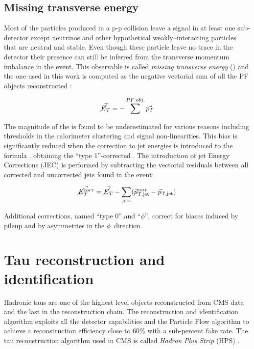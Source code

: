 \subsection{Missing transverse energy}

Most of the particles produced in a p-p collision leave a signal in at least one sub-detector except neutrinos and other hypothetical weakly--interacting particles that are neutral and stable. Even though these particle leave no trace in the detector their presence can still be inferred from the transverse momentum imbalance in the event. This observable is called \emph{missing transverse energy} (\MET) and the one used in this work is computed as the negative vectorial sum of all the PF objects reconstructed \cite{CMS-PAS-JME-13-003}: 

\begin{equation}
\vec{\cancel{E}_T} = -\sum^{PF\;obj.} \vec{p_{T}}
\end{equation}

The magnitude of the \MET is found to be underestimated for various reasons including thresholds in the calorimeter clustering and signal non-linearities. This bias is significantly reduced when the correction to jet energies is introduced to the formula \cite{Chatrchyan:2011ds}, obtaining the ``type 1''-corrected \MET. The introduction of jet Energy Corrections (JEC) is performed by subtracting the vectorial residuals between all corrected and uncorrected jets found in the event:

\begin{equation}
\vec{\cancel{E}_T^{corr}} = \vec{\cancel{E}_T } - \sum_\mathrm{jets} (\vec{p}_\mathrm{T,jet}^\mathrm{corr}-\vec{p}_\mathrm{T,jet})
\label{eq:Type1MET}
\end{equation}

Additional corrections, named ``type 0'' and ``$\phi$'', correct for biases induced by pileup and by asymmetries in the $\phi$\ direction.

\section{Tau reconstruction and identification}

Hadronic taus are one of the highest level objects reconstructed from CMS data and the last in the reconstruction chain. The reconstruction and identification algorithm exploits all the detector capabilities and the Particle Flow algorithm to achieve a reconstruction efficiency close to 60\% with a sub-percent fake rate. The tau reconstruction algorithm used in CMS is called \emph{Hadron Plus Strip} (HPS) \cite{CMS-PAS-TAU-11-001}. 

